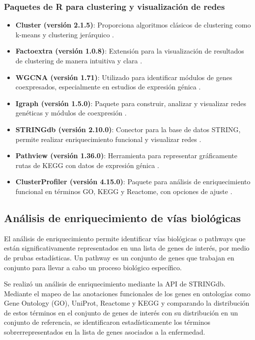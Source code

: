 \vspace{1cm}

\subsubsection*{Paquetes de R para clustering y visualización de redes}

\begin{itemize}
	\item \textbf{Cluster (versión 2.1.5)}: Proporciona algoritmos clásicos de clustering como k-means y clustering jerárquico \cite{cluster}.
	\item \textbf{Factoextra (versión 1.0.8)}: Extensión para la visualización de resultados de clustering de manera intuitiva y clara \cite{factoextra}.
	\item \textbf{WGCNA (versión 1.71)}: Utilizado para identificar módulos de genes coexpresados, especialmente en estudios de expresión génica \cite{wgcna}.
	\item \textbf{Igraph (versión 1.5.0)}: Paquete para construir, analizar y visualizar redes genéticas y módulos de coexpresión \cite{igraph}.
	\item \textbf{STRINGdb (versión 2.10.0)}: Conector para la base de datos STRING, permite realizar enriquecimiento funcional y visualizar redes \cite{stringdb}.
	\item \textbf{Pathview (versión 1.36.0)}: Herramienta para representar gráficamente rutas de KEGG con datos de expresión génica \cite{pathview}.
	\item \textbf{ClusterProfiler (versión 4.15.0)}: Paquete para análisis de enriquecimiento funcional en términos GO, KEGG y Reactome, con opciones de ajuste \cite{clusterprofiler}.
\end{itemize}

\subsection{Análisis de enriquecimiento de vías biológicas}

El análisis de enriquecimiento permite identificar vías biológicas o pathways que están significativamente representados en una lista de genes de interés, por medio de prubas estadísticas. Un pathway es un conjunto de genes que trabajan en conjunto para llevar a cabo un proceso biológico específico.\cite{Reimand2019}

Se realizó un análisis de enriquecimiento mediante la API de STRINGdb. Mediante el mapeo de las anotaciones funcionales de los genes en ontologías como Gene Ontology (GO), UniProt, Reactome y KEGG y comparando la distribución de estos términos en el conjunto de genes de interés con su distribución en un conjunto de referencia, se identificaron estadísticamente los términos sobrerrepresentados en la lista de genes asociados a la enfermedad. \cite{Tipney2010}

